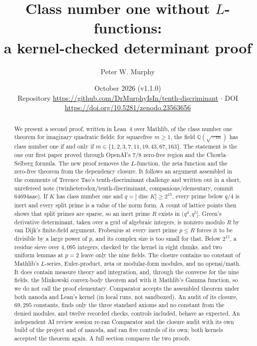 \documentclass[11pt]{article}
\title{Class number one without $L$-functions:\\ a kernel-checked determinant proof}
\author{Peter W. Murphy}
\date{October 2026 (v1.1.0)\\[2pt] \small Repository \url{https://github.com/DrMurphyIsIn/tenth-discriminant} \;$\cdot$\; DOI \url{https://doi.org/10.5281/zenodo.23563656}}
\theoremstyle{definition}
\newcommand{\Q}{\mathbb{Q}}
\newcommand{\disc}{\operatorname{disc}}
\begin{document}
\maketitle

\begin{abstract}
We present a second proof, written in Lean~4 over Mathlib, of the class number one theorem for imaginary quadratic fields: for squarefree $m \ge 1$, the field $\Q(\sqrt{-m})$ has class number one if and only if $m \in \{1, 2, 3, 7, 11, 19, 43, 67, 163\}$. The statement is the one our first paper proved through OpenAI's $7/8$ zero-free region and the Chowla--Selberg formula. The new proof removes the $L$-function, the zeta function and the zero-free theorem from the dependency closure. It follows an argument assembled in the comments of Terence Tao's tenth-discriminant challenge and written out in a short, unrefereed note (twinheterodox/tenth-discriminant, companions/elementary, commit 64694aae). If $K$ has class number one and $q = |\disc K| \ge 2^{15}$, every prime below $q/4$ is inert and every split prime is a value of the norm form. A count of lattice points then shows that split primes are sparse, so an inert prime $R$ exists in $(q^4, q^5]$. Green's derivative determinant, taken over a grid of algebraic integers, is nonzero modulo $R$ by van Dijk's finite-field argument. Frobenius at every inert prime $p \le R$ forces it to be divisible by a large power of $p$, and its complex size is too small for that. Below $2^{15}$, a residue sieve over $4{,}095$ integers, checked by the kernel in eight chunks, and two uniform lemmas at $p = 2$ leave only the nine fields. The closure contains no constant of Mathlib's $L$-series, Euler-product, zeta or modular-form modules, and no openai/math. It does contain measure theory and integration, and, through the converse for the nine fields, the Minkowski convex-body theorem and with it Mathlib's Gamma function, so we do not call the proof elementary. Comparator accepts the assembled theorem under both nanoda and Lean's kernel (in local runs, not sandboxed). An audit of its closure, $69{,}295$ constants, finds only the three standard axioms and no constant from the denied modules, and twelve recorded checks, controls included, behave as expected. An independent AI review session re-ran Comparator and the closure audit with its own build of the project and of nanoda, and ran five controls of its own; both kernels accepted the theorem again. A full section compares the two proofs.
\end{abstract}
\end{document}
